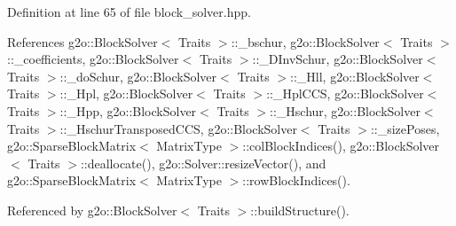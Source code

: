 Definition at line 65 of file block\+\_\+solver.\+hpp.



References g2o\+::\+Block\+Solver$<$ Traits $>$\+::\+\_\+bschur, g2o\+::\+Block\+Solver$<$ Traits $>$\+::\+\_\+coefficients, g2o\+::\+Block\+Solver$<$ Traits $>$\+::\+\_\+\+D\+Inv\+Schur, g2o\+::\+Block\+Solver$<$ Traits $>$\+::\+\_\+do\+Schur, g2o\+::\+Block\+Solver$<$ Traits $>$\+::\+\_\+\+Hll, g2o\+::\+Block\+Solver$<$ Traits $>$\+::\+\_\+\+Hpl, g2o\+::\+Block\+Solver$<$ Traits $>$\+::\+\_\+\+Hpl\+C\+CS, g2o\+::\+Block\+Solver$<$ Traits $>$\+::\+\_\+\+Hpp, g2o\+::\+Block\+Solver$<$ Traits $>$\+::\+\_\+\+Hschur, g2o\+::\+Block\+Solver$<$ Traits $>$\+::\+\_\+\+Hschur\+Transposed\+C\+CS, g2o\+::\+Block\+Solver$<$ Traits $>$\+::\+\_\+size\+Poses, g2o\+::\+Sparse\+Block\+Matrix$<$ Matrix\+Type $>$\+::col\+Block\+Indices(), g2o\+::\+Block\+Solver$<$ Traits $>$\+::deallocate(), g2o\+::\+Solver\+::resize\+Vector(), and g2o\+::\+Sparse\+Block\+Matrix$<$ Matrix\+Type $>$\+::row\+Block\+Indices().



Referenced by g2o\+::\+Block\+Solver$<$ Traits $>$\+::build\+Structure().


